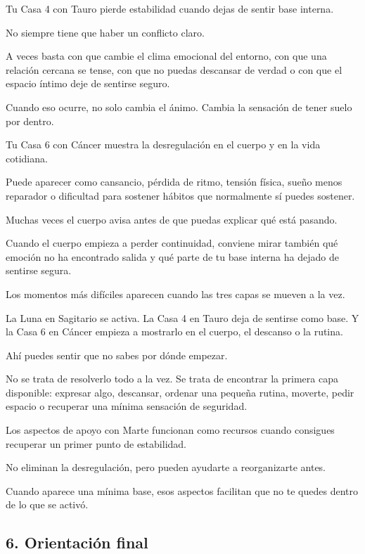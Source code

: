 \documentclass[11pt,a4paper]{article}
\begin{document}
Tu Casa 4 con Tauro pierde estabilidad cuando dejas de sentir base interna.

No siempre tiene que haber un conflicto claro.

A veces basta con que cambie el clima emocional del entorno, con que una relación cercana se tense, con que no puedas descansar de verdad o con que el espacio íntimo deje de sentirse seguro.

Cuando eso ocurre, no solo cambia el ánimo. Cambia la sensación de tener suelo por dentro.

Tu Casa 6 con Cáncer muestra la desregulación en el cuerpo y en la vida cotidiana.

Puede aparecer como cansancio, pérdida de ritmo, tensión física, sueño menos reparador o dificultad para sostener hábitos que normalmente sí puedes sostener.

Muchas veces el cuerpo avisa antes de que puedas explicar qué está pasando.

Cuando el cuerpo empieza a perder continuidad, conviene mirar también qué emoción no ha encontrado salida y qué parte de tu base interna ha dejado de sentirse segura.

Los momentos más difíciles aparecen cuando las tres capas se mueven a la vez.

La Luna en Sagitario se activa.
La Casa 4 en Tauro deja de sentirse como base.
Y la Casa 6 en Cáncer empieza a mostrarlo en el cuerpo, el descanso o la rutina.

Ahí puedes sentir que no sabes por dónde empezar.

No se trata de resolverlo todo a la vez.
Se trata de encontrar la primera capa disponible: expresar algo, descansar, ordenar una pequeña rutina, moverte, pedir espacio o recuperar una mínima sensación de seguridad.

Los aspectos de apoyo con Marte funcionan como recursos cuando consigues recuperar un primer punto de estabilidad.

No eliminan la desregulación, pero pueden ayudarte a reorganizarte antes.

Cuando aparece una mínima base, esos aspectos facilitan que no te quedes dentro de lo que se activó.

\vspace{0.8cm}

\subsection{6. Orientación final}
\end{document}
